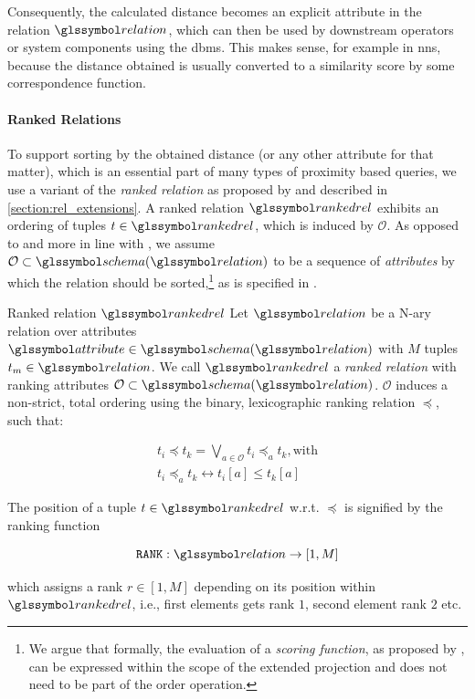 Consequently, the calculated distance becomes an explicit attribute in the relation $\relation$, which can then be used by downstream operators or system components using the \acrshort{dbms}. This makes sense, for example in \acrshort{nns}, because the distance obtained is usually converted to a similarity score by some correspondence function.

\paragraph{Ranked Relations}

To support sorting by the obtained distance (or any other attribute for that matter), which is an essential part of many types of proximity based queries, we use a variant of the \emph{ranked relation} as proposed by \cite{Chengkai:2005RankSQL} and described in \cref{section:rel_extensions}. A ranked relation $\rankedrel$ exhibits an ordering of tuples $t \in \rankedrel$, which is induced by $\mathcal{O}$. As opposed to \cite{Chengkai:2005RankSQL} and more in line with \cite{Garcia:2009Database}, we assume $\mathcal{O} \subset \schema (\relation)$ to be a sequence of \emph{attributes} by which the relation should be sorted,\footnote{We argue that formally, the evaluation of a \emph{scoring function}, as proposed by \cite{Chengkai:2005RankSQL}, can be expressed within the scope of the extended projection and does not need to be part of the order operation.} as is specified in .

\begin{definition}[label=definition:ranked_relation]{Ranked relation $\rankedrel$}{}
Let $\relation$ be a N-ary relation over attributes $\attribute \in \schema (\relation)$ with $M$ tuples $t_m \in \relation$. We call $\rankedrel$ a \emph{ranked relation} with ranking attributes $\mathcal{O} \subset \schema (\relation)$. $\mathcal{O}$ induces a non-strict, total ordering using the binary, lexicographic ranking relation $\preceq$, such that:

\begin{gather*}
    t_i \preceq t_k  = \bigvee_{a \in \mathcal{O}} t_i \preceq_{a} t_k, \textrm{with} \\ 
    t_i \preceq_{a} t_k  \leftrightarrow t_i \left[ a \right] \leq t_k \left[ a \right]
\end{gather*}

The position of a tuple $t \in \rankedrel$ w.r.t. $\preceq$ is signified by the ranking function

\begin{equation*}
    \mathtt{RANK}: \relation \rightarrow \left[ 1, M \right]
\end{equation*}

which assigns a rank $r \in \left[ 1, M \right]$ depending on its position within $\rankedrel$, i.e., first elements gets rank $1$, second element rank $2$ etc.

\end{definition}


